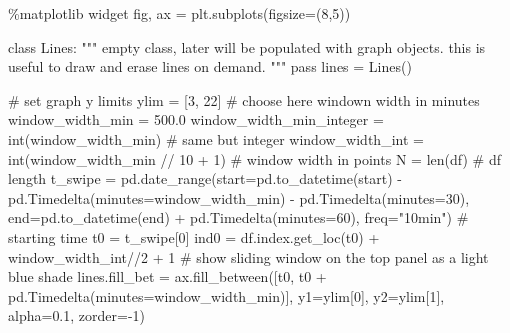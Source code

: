 \documentclass[
  letterpaper,
  DIV=11,
  numbers=noendperiod,
  oneside]{scrreprt}
\newenvironment{Shaded}{\begin{snugshade}}{\end{snugshade}}
\newcommand{\BuiltInTok}[1]{\textcolor[rgb]{0.00,0.23,0.31}{#1}}
\newcommand{\CommentTok}[1]{\textcolor[rgb]{0.37,0.37,0.37}{#1}}
\newcommand{\ControlFlowTok}[1]{\textcolor[rgb]{0.00,0.23,0.31}{#1}}
\newcommand{\DecValTok}[1]{\textcolor[rgb]{0.68,0.00,0.00}{#1}}
\newcommand{\FloatTok}[1]{\textcolor[rgb]{0.68,0.00,0.00}{#1}}
\newcommand{\KeywordTok}[1]{\textcolor[rgb]{0.00,0.23,0.31}{#1}}
\newcommand{\NormalTok}[1]{\textcolor[rgb]{0.00,0.23,0.31}{#1}}
\newcommand{\OperatorTok}[1]{\textcolor[rgb]{0.37,0.37,0.37}{#1}}
\newcommand{\StringTok}[1]{\textcolor[rgb]{0.13,0.47,0.30}{#1}}
\begin{document}
\begin{Shaded}
\begin{Highlighting}[]
\OperatorTok{\%}\NormalTok{matplotlib widget}
\NormalTok{fig, ax }\OperatorTok{=}\NormalTok{ plt.subplots(figsize}\OperatorTok{=}\NormalTok{(}\DecValTok{8}\NormalTok{,}\DecValTok{5}\NormalTok{))}

\KeywordTok{class}\NormalTok{ Lines:}
    \CommentTok{"""}
\CommentTok{    empty class, later will be populated with graph objects.}
\CommentTok{    this is useful to draw and erase lines on demand.}
\CommentTok{    """}
    \ControlFlowTok{pass}
\NormalTok{lines }\OperatorTok{=}\NormalTok{ Lines()}

\CommentTok{\# set graph y limits}
\NormalTok{ylim }\OperatorTok{=}\NormalTok{ [}\DecValTok{3}\NormalTok{, }\DecValTok{22}\NormalTok{]}
\CommentTok{\# choose here windown width in minutes}
\NormalTok{window\_width\_min }\OperatorTok{=} \FloatTok{500.0}
\NormalTok{window\_width\_min\_integer }\OperatorTok{=} \BuiltInTok{int}\NormalTok{(window\_width\_min)  }\CommentTok{\# same but integer}
\NormalTok{window\_width\_int }\OperatorTok{=} \BuiltInTok{int}\NormalTok{(window\_width\_min }\OperatorTok{//} \DecValTok{10} \OperatorTok{+} \DecValTok{1}\NormalTok{)  }\CommentTok{\# window width in points}
\NormalTok{N }\OperatorTok{=} \BuiltInTok{len}\NormalTok{(df)  }\CommentTok{\# df length}
\NormalTok{t\_swipe }\OperatorTok{=}\NormalTok{ pd.date\_range(start}\OperatorTok{=}\NormalTok{pd.to\_datetime(start) }\OperatorTok{{-}}\NormalTok{ pd.Timedelta(minutes}\OperatorTok{=}\NormalTok{window\_width\_min) }\OperatorTok{{-}}\NormalTok{ pd.Timedelta(minutes}\OperatorTok{=}\DecValTok{30}\NormalTok{),}
\NormalTok{                        end}\OperatorTok{=}\NormalTok{pd.to\_datetime(end) }\OperatorTok{+}\NormalTok{ pd.Timedelta(minutes}\OperatorTok{=}\DecValTok{60}\NormalTok{),}
\NormalTok{                        freq}\OperatorTok{=}\StringTok{"10min"}\NormalTok{)}
\CommentTok{\# starting time}
\NormalTok{t0 }\OperatorTok{=}\NormalTok{ t\_swipe[}\DecValTok{0}\NormalTok{]}
\NormalTok{ind0 }\OperatorTok{=}\NormalTok{ df.index.get\_loc(t0) }\OperatorTok{+}\NormalTok{ window\_width\_int}\OperatorTok{//}\DecValTok{2} \OperatorTok{+} \DecValTok{1}
\CommentTok{\# show sliding window on the top panel as a light blue shade}
\NormalTok{lines.fill\_bet }\OperatorTok{=}\NormalTok{ ax.fill\_between([t0, t0 }\OperatorTok{+}\NormalTok{ pd.Timedelta(minutes}\OperatorTok{=}\NormalTok{window\_width\_min)],}
\NormalTok{                                           y1}\OperatorTok{=}\NormalTok{ylim[}\DecValTok{0}\NormalTok{], y2}\OperatorTok{=}\NormalTok{ylim[}\DecValTok{1}\NormalTok{], alpha}\OperatorTok{=}\FloatTok{0.1}\NormalTok{, zorder}\OperatorTok{={-}}\DecValTok{1}\NormalTok{)}


\end{Highlighting}
\end{Shaded}
\end{document}
